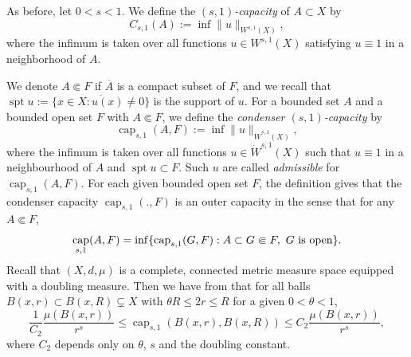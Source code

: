 \documentclass[11pt,leqno]{amsart}
\numberwithin{equation}{section}
\theoremstyle{definition}
\DeclareMathOperator{\capp}{cap}
\newcommand{\caps}{\capp_{s,1}}
\DeclareMathOperator{\supp}{spt}
\begin{document}
	As before, let $0<s<1$. We define the \emph{$(s,1)$-capacity} of $A\subset X$ by
	\[
	C_{s,1}(A):=\inf \|u\|_{W^{s,1}(X)},
	\]
	where the infimum is taken over all functions $u\in W^{s,1}(X)$  satisfying $u\equiv 1$ in a neighborhood of $A$. 
	
	We denote $A\Subset F$ if $\overline A$ is a compact subset of $F$, and we recall that
	$\supp u:=\overline{\{ x\in X: u(x)\neq 0\}}$ is the support of $u$.
	For a bounded set $A$ and a bounded open set $F$ with $A\Subset F$, we define the \emph{condenser $(s,1)$-capacity} by 
	\[
	\caps(A,F):=\inf  \|u\|_{\dot W^{s,1}(X)},
	\]
	where the infimum is taken over all  functions $u\in\dot W^{s,1}(X)$ such that
	$u\equiv 1$ in a neighbourhood of $A$ and $\supp u\subset F$. Such $u$ are called
	\emph{admissible} for $\caps(A,F)$.  For each given bounded open set $F$,  the definition
	gives that the condenser capacity $\caps(.,F)$ is an outer capacity in the sense that
	for any $A\Subset F$, 
	\begin{equation}\label{eq2.8-22nov}
		\caps(A,F)=\inf\{ {\rm cap}_{s,1}(G,F): A\subset G\Subset F,\ G \text{\ is open} \}.
	\end{equation}
	Recall that $(X,d,\mu)$ is a complete, connected metric measure space equipped with a doubling measure.  Then we  have from \cite[Proposition 4.1]{BB23} that for all balls $B(x,r)\subset B(x,R)\subsetneq X$ with $\theta R \leq 2r\leq R$ for a given $0<\theta<1$, 
	\begin{equation}\label{eq4.1-28oct}
		\frac{1}{C_2}\frac{\mu(B(x,r))}{r^s}\le\caps (B(x,r), B(x,R))\le C_2 \frac{\mu(B(x,r))}{r^s},
	\end{equation}
	where $C_2$ depends only on $\theta$, $s$ and the doubling constant.
	
	
	
\end{document}
